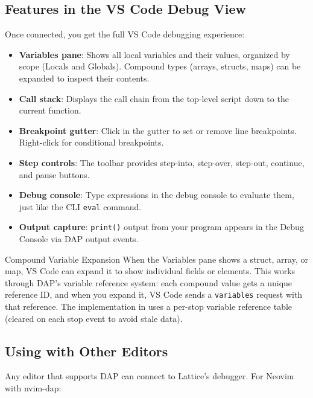 \subsection{Features in the VS Code Debug View}\label{sec:vscode-features}

Once connected, you get the full VS Code debugging experience:

\begin{itemize}
  \item \textbf{Variables pane}: Shows all local variables and their values, organized by scope (Locals and Globals). Compound types (arrays, structs, maps) can be expanded to inspect their contents.
  \item \textbf{Call stack}: Displays the call chain from the top-level script down to the current function.
  \item \textbf{Breakpoint gutter}: Click in the gutter to set or remove line breakpoints. Right-click for conditional breakpoints.
  \item \textbf{Step controls}: The toolbar provides step-into, step-over, step-out, continue, and pause buttons.
  \item \textbf{Debug console}: Type expressions in the debug console to evaluate them, just like the CLI \lstinline|eval| command.
  \item \textbf{Output capture}: \lstinline|print()| output from your program appears in the Debug Console via DAP output events.
\end{itemize}

\begin{notebox}{Compound Variable Expansion}
When the Variables pane shows a struct, array, or map, VS Code can expand it to show individual fields or elements.
This works through DAP's variable reference system: each compound value gets a unique reference ID, and when you expand it, VS Code sends a \lstinline|variables| request with that reference.
The implementation in  uses a per-stop variable reference table (cleared on each stop event to avoid stale data).
\end{notebox}

\subsection{Using with Other Editors}\label{sec:dap-other-editors}

Any editor that supports DAP can connect to Lattice's debugger.
For Neovim with nvim-dap:

